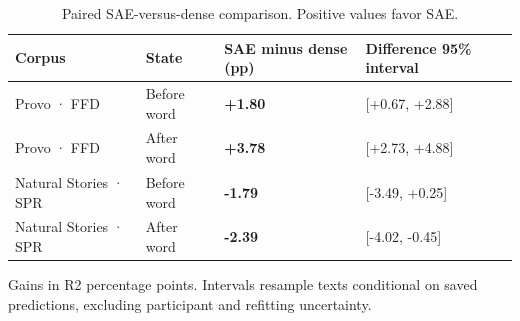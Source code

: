 \begin{table}[t]
\caption{Paired SAE-versus-dense comparison. Positive values favor SAE.}
\label{tab:sae-dense-contrast}
\begin{tabular}{llll}
\toprule
Corpus & State & SAE minus dense (pp) & Difference 95\% interval \\
\midrule
Provo · FFD & Before word & \textbf{+1.80} & [+0.67, +2.88] \\
Provo · FFD & After word & \textbf{+3.78} & [+2.73, +4.88] \\
Natural Stories · SPR & Before word & \textbf{-1.79} & [-3.49, +0.25] \\
Natural Stories · SPR & After word & \textbf{-2.39} & [-4.02, -0.45] \\
\bottomrule
\end{tabular}
\par\smallskip
\begin{minipage}{\linewidth}\footnotesize
Gains in R2 percentage points. Intervals resample texts conditional on saved predictions, excluding participant and refitting uncertainty.
\end{minipage}
\end{table}
